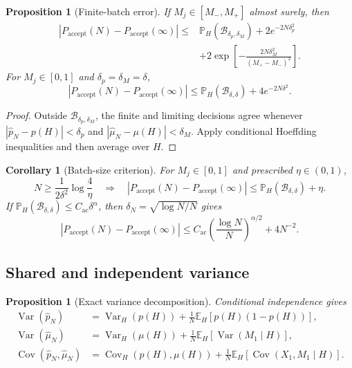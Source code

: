 \documentclass[pdflatex,sn-mathphys-num]{sn-jnl}
\numberwithin{equation}{section}
\theoremstyle{thmstyleone}%
\newtheorem{proposition}[theorem]{Proposition}
\newtheorem{corollary}[theorem]{Corollary}
\theoremstyle{definition}
\theoremstyle{remark}
\begin{document}
\begin{appendices}
\begin{proposition}[Finite-batch error]
\label{prop:app_finite_batch}
If $M_j\in[M_-,M_+]$ almost surely, then
\begin{align}
|P_{\mathrm{accept}}(N)-P_{\mathrm{accept}}(\infty)|
\leq{}&\mathbb P_H(\mathcal B_{\delta_p,\delta_M})
+2e^{-2N\delta_p^2}\nonumber\\
&+2\exp\!\left[-\frac{2N\delta_M^2}{(M_+-M_-)^2}\right].
\label{eq:app_finite_batch_bound}
\end{align}
For $M_j\in[0,1]$ and $\delta_p=\delta_M=\delta$,
\begin{equation}
|P_{\mathrm{accept}}(N)-P_{\mathrm{accept}}(\infty)|
\leq\mathbb P_H(\mathcal B_{\delta,\delta})+4e^{-2N\delta^2}.
\label{eq:app_finite_batch_unit}
\end{equation}
\end{proposition}

\begin{proof}
Outside $\mathcal B_{\delta_p,\delta_M}$, the finite and limiting decisions
agree whenever
$|\widehat p_N-p(H)|<\delta_p$ and
$|\widehat\mu_N-\mu(H)|<\delta_M$. Apply conditional Hoeffding inequalities
and then average over $H$.
\end{proof}

\begin{corollary}[Batch-size criterion]
For $M_j\in[0,1]$ and prescribed $\eta\in(0,1)$,
\[
N\geq\frac1{2\delta^2}\log\frac4\eta
\quad\Longrightarrow\quad
|P_{\mathrm{accept}}(N)-P_{\mathrm{accept}}(\infty)|
\leq\mathbb P_H(\mathcal B_{\delta,\delta})+\eta.
\]
If $\mathbb P_H(\mathcal B_{\delta,\delta})\leq C_{\mathrm{ac}}\delta^\alpha$,
then $\delta_N=\sqrt{\log N/N}$ gives
\[
|P_{\mathrm{accept}}(N)-P_{\mathrm{accept}}(\infty)|
\leq C_{\mathrm{ac}}\left(\frac{\log N}{N}\right)^{\alpha/2}+4N^{-2}.
\]
\end{corollary}

\subsection{Shared and independent variance}

\begin{proposition}[Exact variance decomposition]
\label{prop:app_batch_variance}
Conditional independence gives
\begin{align}
\operatorname{Var}(\widehat p_N)
&=\operatorname{Var}_H(p(H))
+\frac1N\mathbb E_H[p(H)(1-p(H))],\\
\operatorname{Var}(\widehat\mu_N)
&=\operatorname{Var}_H(\mu(H))
+\frac1N\mathbb E_H[\operatorname{Var}(M_1\mid H)],\\
\operatorname{Cov}(\widehat p_N,\widehat\mu_N)
&=\operatorname{Cov}_H(p(H),\mu(H))
+\frac1N\mathbb E_H[\operatorname{Cov}(X_1,M_1\mid H)].
\end{align}
\end{proposition}


\end{appendices}
\end{document}
